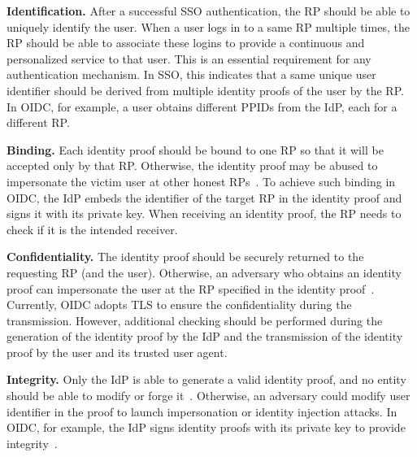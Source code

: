 \vspace{1mm}\noindent\textbf{Identification.} %
After a successful SSO authentication, the RP should be able to uniquely identify the user. When a user logs in to a same RP multiple times, the RP should be able to associate these logins to provide a continuous and personalized service to that user. This is an essential requirement for any authentication mechanism. In SSO, this indicates that a same unique user identifier should be derived from multiple identity proofs of the user by the RP. In OIDC, for example, a user obtains different PPIDs from the IdP, each for a different RP.


\vspace{1mm}\noindent\textbf{Binding.} Each identity proof should be bound to one RP so that it will be accepted only by that RP. Otherwise, the identity proof may be abused to impersonate the victim user at other honest RPs~\cite{ChenPCTKT14, WangZLG16}. To achieve such binding in OIDC, the IdP embeds the identifier of the target RP in the identity proof and signs it with its private key. When receiving an identity proof, the RP needs to check if it is the intended receiver.

\vspace{1mm}\noindent\textbf{Confidentiality.} The identity proof should be securely returned to the requesting RP (and the user). Otherwise, an adversary who obtains an identity proof can impersonate the user at the RP specified in the identity proof~\cite{ChenPCTKT14,FettKS16,WangZLG16}. Currently, OIDC adopts TLS to ensure the confidentiality during the transmission. However, additional checking should be performed during the generation of the identity proof by the IdP and the transmission of the identity proof by the user and its trusted user agent.

\vspace{1mm}\noindent\textbf{Integrity.} Only the IdP is able to generate a valid identity proof,
    and no entity should be able to modify or forge it~\cite{WangZLG16}. Otherwise, an adversary could modify user identifier in the proof to launch impersonation or identity injection attacks. In OIDC, for example, the IdP signs identity proofs with its private key to provide integrity~\cite{WangCW12, SomorovskyMSKJ12}.

